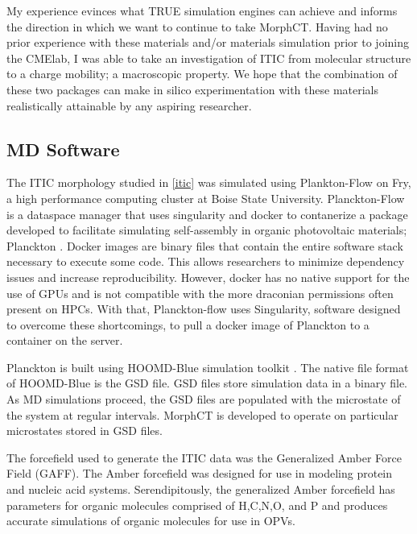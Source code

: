 My experience evinces what TRUE simulation engines can achieve and
informs the direction in which we want to continue to take MorphCT. 
Having had no prior experience with these materials and/or materials simulation prior to joining the CMElab,
I was able to take an investigation of ITIC from molecular
structure to a charge mobility; a macroscopic property. We hope that the combination of these two packages
can make in silico experimentation with these materials realistically attainable by any aspiring researcher.

\subsection{MD Software}
\label{planckton}

The ITIC morphology studied in \autoref{itic} was simulated using Plankton-Flow \cite{cmelab} on Fry, 
a high performance computing cluster at Boise State University. 
Planckton-Flow is a dataspace manager that uses
singularity \cite{singularity2017} and docker \cite{Merkel:2014:DLL:2600239.2600241} 
to contanerize a package developed to facilitate simulating self-assembly in
organic photovoltaic materials; Planckton \cite{cmelab}. Docker images are binary files that contain the
entire software stack necessary to execute some code. This allows researchers to minimize dependency issues
and increase reproducibility. However, docker has no native support for the use of GPUs and is not
compatible with the more draconian permissions often present on HPCs. With that, Planckton-flow uses 
Singularity, software designed to overcome these shortcomings,
to pull a docker image of Planckton to a container on the server. 

Planckton is built using HOOMD-Blue simulation toolkit \cite{Anderson2020a}.
The native file format of HOOMD-Blue is the GSD file. GSD files store simulation data in a binary file. As MD
simulations proceed, the GSD files are populated with the microstate of the system at regular intervals.
MorphCT is developed to operate on particular microstates stored in GSD files.

The forcefield used to generate the ITIC data was the Generalized
Amber Force Field (GAFF)\cite{Wang2004a}.
The Amber forcefield was designed for use in modeling protein and
nucleic acid systems. Serendipitously, the generalized Amber forcefield has parameters for organic molecules
comprised of H,C,N,O, and P and produces accurate simulations of organic molecules for use in OPVs. 


